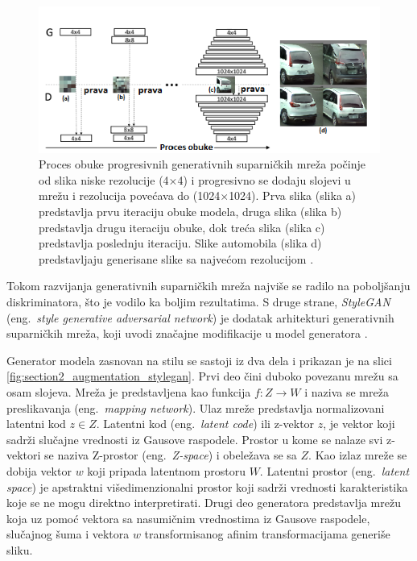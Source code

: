 \documentclass[12pt,oneside]{memoir}
\begin{document}
\begin{figure}[ht]
    \centering
    \includegraphics[width=1\textwidth]{matfmaster/glava2/progressive_gan.png}
    \caption{Proces obuke progresivnih generativnih suparničkih mreža počinje od slika niske rezolucije (4\(\times\)4) i progresivno se dodaju slojevi u mrežu i rezolucija povećava do (1024\(\times\)1024). Prva slika (slika a) predstavlja prvu iteraciju obuke modela, druga slika (slika b) predstavlja drugu iteraciju obuke, dok treća slika (slika c) predstavlja poslednju iteraciju. Slike automobila (slika d) predstavljaju generisane slike sa najvećom rezolucijom \cite{karras2017progressive}. }
    \label{fig:section2_augmentation_progressivegans}
\end{figure}

Tokom razvijanja generativnih suparničkih mreža najviše se radilo na poboljšanju diskriminatora, što je vodilo ka boljim rezultatima. S druge strane, \textit{StyleGAN} (eng.~\textit{style generative adversarial network}) je dodatak arhitekturi generativnih suparničkih mreža, koji uvodi značajne modifikacije u model generatora \cite{karras2019style}. 


Generator modela zasnovan na stilu se sastoji iz dva dela i prikazan je na slici \ref{fig:section2_augmentation_stylegan}. 
Prvi deo čini duboko povezanu mrežu sa osam slojeva. Mreža je predstavljena kao funkcija \(f: Z\to W\) i naziva se mreža preslikavanja (eng.~\textit{mapping network}). Ulaz mreže predstavlja normalizovani latentni kod \(z \in Z\). Latentni kod (eng.~\textit{latent code}) ili z-vektor \(z\), je vektor koji sadrži slučajne vrednosti iz Gausove raspodele. Prostor u kome se nalaze svi z-vektori se naziva Z-prostor (eng.~\textit{Z-space}) i obeležava se sa \(Z\). Kao izlaz mreže se dobija vektor \(w\) koji pripada latentnom prostoru \(W\). Latentni prostor (eng.~\textit{latent space}) je apstraktni višedimenzionalni prostor koji sadrži vrednosti karakteristika koje se ne mogu direktno interpretirati.
Drugi deo generatora predstavlja mrežu koja uz pomoć vektora sa nasumičnim vrednostima iz Gausove raspodele, slučajnog šuma i vektora \(w\) transformisanog afinim transformacijama generiše sliku. 
\end{document}
